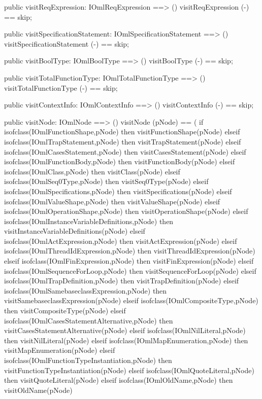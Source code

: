 \begin{vdm_al}
  public visitReqExpression: IOmlReqExpression ==> ()
  visitReqExpression (-) == skip;

  public visitSpecificationStatement: IOmlSpecificationStatement ==> ()
  visitSpecificationStatement (-) == skip;

  public visitBoolType: IOmlBoolType ==> ()
  visitBoolType (-) == skip;

  public visitTotalFunctionType: IOmlTotalFunctionType ==> ()
  visitTotalFunctionType (-) == skip;

  public visitContextInfo: IOmlContextInfo ==> ()
  visitContextInfo (-) == skip;

  public visitNode: IOmlNode ==> ()
  visitNode (pNode) ==
    ( if isofclass(IOmlFunctionShape,pNode) then visitFunctionShape(pNode)
      elseif isofclass(IOmlTrapStatement,pNode) then visitTrapStatement(pNode)
      elseif isofclass(IOmlCasesStatement,pNode) then visitCasesStatement(pNode)
      elseif isofclass(IOmlFunctionBody,pNode) then visitFunctionBody(pNode)
      elseif isofclass(IOmlClass,pNode) then visitClass(pNode)
      elseif isofclass(IOmlSeq0Type,pNode) then visitSeq0Type(pNode)
      elseif isofclass(IOmlSpecifications,pNode) then visitSpecifications(pNode)
      elseif isofclass(IOmlValueShape,pNode) then visitValueShape(pNode)
      elseif isofclass(IOmlOperationShape,pNode) then visitOperationShape(pNode)
      elseif isofclass(IOmlInstanceVariableDefinitions,pNode) then visitInstanceVariableDefinitions(pNode)
      elseif isofclass(IOmlActExpression,pNode) then visitActExpression(pNode)
      elseif isofclass(IOmlThreadIdExpression,pNode) then visitThreadIdExpression(pNode)
      elseif isofclass(IOmlFinExpression,pNode) then visitFinExpression(pNode)
      elseif isofclass(IOmlSequenceForLoop,pNode) then visitSequenceForLoop(pNode)
      elseif isofclass(IOmlTrapDefinition,pNode) then visitTrapDefinition(pNode)
      elseif isofclass(IOmlSamebaseclassExpression,pNode) then visitSamebaseclassExpression(pNode)
      elseif isofclass(IOmlCompositeType,pNode) then visitCompositeType(pNode)
      elseif isofclass(IOmlCasesStatementAlternative,pNode) then visitCasesStatementAlternative(pNode)
      elseif isofclass(IOmlNilLiteral,pNode) then visitNilLiteral(pNode)
      elseif isofclass(IOmlMapEnumeration,pNode) then visitMapEnumeration(pNode)
      elseif isofclass(IOmlFunctionTypeInstantiation,pNode) then visitFunctionTypeInstantiation(pNode)
      elseif isofclass(IOmlQuoteLiteral,pNode) then visitQuoteLiteral(pNode)
      elseif isofclass(IOmlOldName,pNode) then visitOldName(pNode)

\end{vdm_al}
